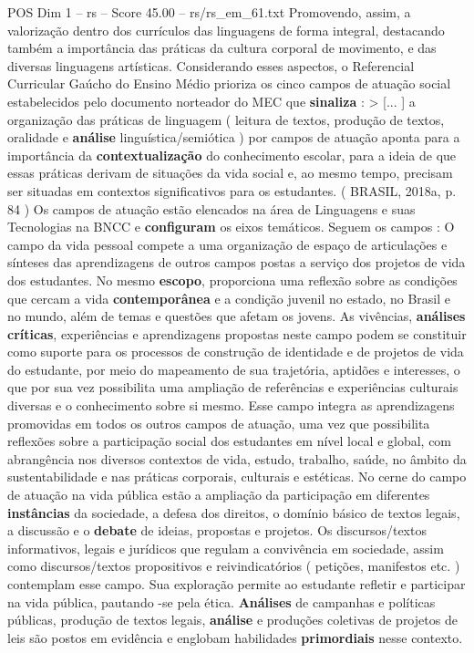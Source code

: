 \begin{textsample}{POS Dim 1 – rs – Score 45.00 – rs/rs\_em\_61.txt}
Promovendo, assim, a valorização dentro dos currículos das linguagens de forma integral, destacando também a importância das práticas da cultura corporal de movimento, e das diversas linguagens artísticas.
Considerando esses aspectos, o Referencial Curricular Gaúcho do Ensino Médio prioriza os cinco campos de atuação social estabelecidos pelo documento norteador do MEC que \textbf{sinaliza} : > [... ] a organização das práticas de linguagem ( leitura de textos, produção de textos, oralidade e \textbf{análise} linguística/semiótica ) por campos de atuação aponta para a importância da \textbf{contextualização} do conhecimento escolar, para a ideia de que essas práticas derivam de situações da vida social e, ao mesmo tempo, precisam ser situadas em contextos significativos para os estudantes. ( BRASIL, 2018a, p. 84 ) Os campos de atuação estão elencados na área de Linguagens e suas Tecnologias na BNCC e \textbf{configuram} os eixos temáticos.
Seguem os campos : O campo da vida pessoal compete a uma organização de espaço de articulações e sínteses das aprendizagens de outros campos postas a serviço dos projetos de vida dos estudantes.
No mesmo \textbf{escopo}, proporciona uma reflexão sobre as condições que cercam a vida \textbf{contemporânea} e a condição juvenil no estado, no Brasil e no mundo, além de temas e questões que afetam os jovens.
As vivências, \textbf{análises} \textbf{críticas}, experiências e aprendizagens propostas neste campo podem se constituir como suporte para os processos de construção de identidade e de projetos de vida do estudante, por meio do mapeamento de sua trajetória, aptidões e interesses, o que por sua vez possibilita uma ampliação de referências e experiências culturais diversas e o conhecimento sobre si mesmo.
Esse campo integra as aprendizagens promovidas em todos os outros campos de atuação, uma vez que possibilita reflexões sobre a participação social dos estudantes em nível local e global, com abrangência nos diversos contextos de vida, estudo, trabalho, saúde, no âmbito da sustentabilidade e nas práticas corporais, culturais e estéticas.
No cerne do campo de atuação na vida pública estão a ampliação da participação em diferentes \textbf{instâncias} da sociedade, a defesa dos direitos, o domínio básico de textos legais, a discussão e o \textbf{debate} de ideias, propostas e projetos.
Os discursos/textos informativos, legais e jurídicos que regulam a convivência em sociedade, assim como discursos/textos propositivos e reivindicatórios ( petições, manifestos etc. ) contemplam esse campo.
Sua exploração permite ao estudante refletir e participar na vida pública, pautando -se pela ética. \textbf{Análises} de campanhas e políticas públicas, produção de textos legais, \textbf{análise} e produções coletivas de projetos de leis são postos em evidência e englobam habilidades \textbf{primordiais} nesse contexto.

\end{textsample}
